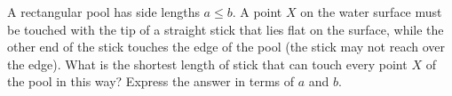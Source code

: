 A rectangular pool has side lengths $a\le b$. A point $X$ on the water surface must be touched with the tip of a straight stick that lies flat on the surface, while the other end of the stick touches the edge of the pool (the stick may not reach over the edge). What is the shortest length of stick that can touch every point $X$ of the pool in this way? Express the answer in terms of $a$ and $b$.
